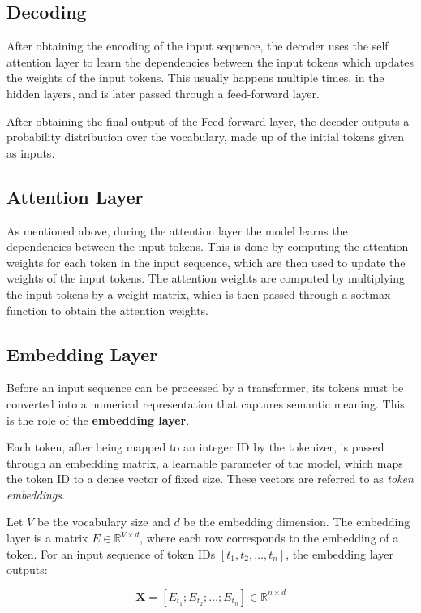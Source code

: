 \subsection{Decoding}\label{Section2.2.2}
After obtaining the encoding of the input sequence, the decoder uses the self attention layer to learn the dependencies between the input tokens which updates the weights of the input tokens. This usually happens multiple times, in the hidden layers, and is later passed through a feed-forward layer.

After obtaining the final output of the Feed-forward layer, the decoder outputs a probability distribution over the vocabulary, made up of the initial tokens given as inputs.

\subsection{Attention Layer}\label{Section2.2.3}
As mentioned above, during the attention layer the model learns the dependencies between the input tokens. This is done by computing the attention weights for each token in the input sequence, which are then used to update the weights of the input tokens.
The attention weights are computed by multiplying the input tokens by a weight matrix, which is then passed through a softmax function to obtain the attention weights.

\subsection{Embedding Layer}\label{Section2.2.4}
Before an input sequence can be processed by a transformer, its tokens must be converted into a numerical representation that captures semantic meaning. This is the role of the \textbf{embedding layer}.

Each token, after being mapped to an integer ID by the tokenizer, is passed through an embedding matrix, a learnable parameter of the model, which maps the token ID to a dense vector of fixed size. These vectors are referred to as \textit{token embeddings}.

Let \( V \) be the vocabulary size and \( d \) be the embedding dimension. The embedding layer is a matrix \( E \in \mathbb{R}^{V \times d} \), where each row corresponds to the embedding of a token. For an input sequence of token IDs \( [t_1, t_2, \dots, t_n] \), the embedding layer outputs:

\[
\mathbf{X} = [E_{t_1}; E_{t_2}; \dots; E_{t_n}] \in \mathbb{R}^{n \times d}
\]

